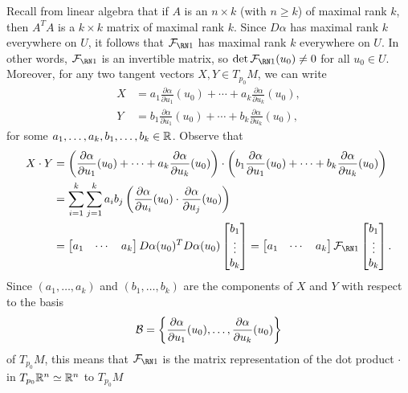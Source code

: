 Recall from linear algebra that if $A$ is an $n \times k$ (with $n \geq k$) 
of maximal rank $k$, then $A^T A$ is a $k \times k$ matrix of maximal rank $k$. 
Since $D\alpha$ has maximal rank $k$ everywhere on $U$, it follows that 
$\FFF$ has maximal rank $k$ everywhere on $U$. In other words, $\FFF$ 
is an invertible matrix, so $\det \FFF(u_0) \neq 0$ for all $u_0 \in U$. 
Moreover, for any two tangent vectors $X, Y \in T_{p_0}M$, we can write 
\begin{align*}
    X &= a_1 \frac{\partial\alpha}{\partial u_1}(u_0) + \cdots 
    + a_k \frac{\partial\alpha}{\partial u_k}(u_0), \\ 
    Y &= b_1 \frac{\partial\alpha}{\partial u_1}(u_0) + \cdots 
    + b_k \frac{\partial\alpha}{\partial u_k}(u_0),
\end{align*}
for some $a_1, \dots, a_k, b_1, \dots, b_k \in \mathbb{R}$. Observe that 
\begin{align*}
    X \cdot Y &= \left( \frac{\partial\alpha}{\partial u_1}(u_0) + \cdots 
    + a_k \frac{\partial\alpha}{\partial u_k}(u_0) \right) 
    \cdot \left( b_1 \frac{\partial\alpha}{\partial u_1}(u_0) + \cdots 
    + b_k \frac{\partial\alpha}{\partial u_k}(u_0) \right) \\
    &= \sum_{i=1}^k \sum_{j=1}^k a_i b_j \left( \frac{\partial\alpha}{\partial u_i}(u_0) 
    \cdot \frac{\partial\alpha}{\partial u_j}(u_0) \right) \\ 
    &= \begin{bmatrix}
        a_1 & \cdots & a_k 
    \end{bmatrix} D\alpha(u_0)^T D\alpha(u_0) \begin{bmatrix}
        b_1 \\ \vdots \\ b_k 
    \end{bmatrix} 
    = \begin{bmatrix}
        a_1 & \cdots & a_k 
    \end{bmatrix} \FFF \begin{bmatrix}
        b_1 \\ \vdots \\ b_k 
    \end{bmatrix}. 
\end{align*}
Since $(a_1, \dots, a_k)$ and $(b_1, \dots, b_k)$ are the components of 
$X$ and $Y$ with respect to the basis 
\[ {\cal B} = \left\{ \frac{\partial\alpha}{\partial u_1}(u_0), 
\dots, \frac{\partial\alpha}{\partial u_k}(u_0) \right\} \] 
of $T_{p_0}M$, this means that $\FFF$ is the matrix representation 
of the dot product $\cdot$ in $T_{p_0}\mathbb{R}^n \simeq \mathbb{R}^n$ to $T_{p_0}M$ 
